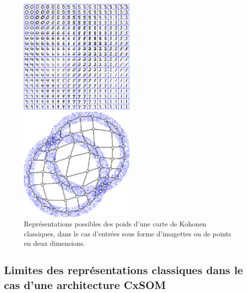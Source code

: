 \documentclass[../main]{subfiles}
\begin{document}
\begin{figure}
\begin{minipage}{0.5\textwidth}
\centering
\includegraphics[width=0.5\textwidth]{digits.jpg}
\end{minipage}
\begin{minipage}{0.5\textwidth}
\centering
\includegraphics[width=0.5\textwidth]{points.png}
\end{minipage}
\caption{Représentations possibles des poids d'une carte de Kohonen classiques, dans le cas d'entrées sous forme d'imagettes ou de points en deux dimensions.\label{fig:representation}}
\end{figure}

\subsection{Limites des représentations classiques dans le cas d'une architecture CxSOM}
\end{document}
